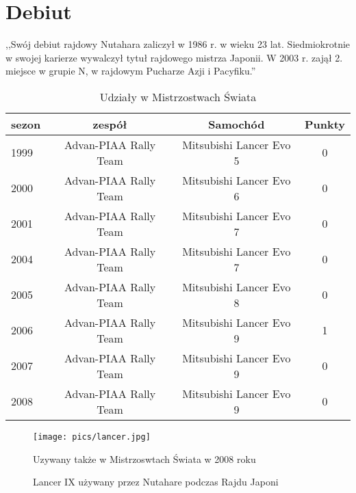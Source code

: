\documentclass[a4paper,12pt]{article}
\begin{document}
\section {Debiut}
\label{deb}
,,Swój debiut rajdowy Nutahara zaliczył w 1986 r. w wieku 23 lat. Siedmiokrotnie w swojej karierze wywalczył tytuł rajdowego mistrza Japonii. W 2003 r. zajął 2. miejsce w grupie N, w rajdowym Pucharze Azji i Pacyfiku.''
\begin{table}
\begin {tabular}{lccc}
\hline
\textbf{sezon}&\textbf {zespół}&\textbf{Samochód}&\textbf{Punkty}\\
\hline
1999&Advan-PIAA Rally Team&Mitsubishi Lancer Evo 5&0\\
\hline
2000&Advan-PIAA Rally Team&Mitsubishi Lancer Evo 6&0\\
\hline
2001&Advan-PIAA Rally Team&Mitsubishi Lancer Evo 7&0\\
\hline
2004&Advan-PIAA Rally Team&Mitsubishi Lancer Evo 7&0\\
\hline
2005&Advan-PIAA Rally Team&Mitsubishi Lancer Evo 8&0\\
\hline
2006&Advan-PIAA Rally Team&Mitsubishi Lancer Evo 9&1\\
\hline
2007&Advan-PIAA Rally Team&Mitsubishi Lancer Evo 9&0\\
\hline
2008&Advan-PIAA Rally Team&Mitsubishi Lancer Evo 9&0 \\
\hline
\end{tabular}
\caption{Udziały w Mistrzostwach Świata}\label{table}
\end {table}
\begin{figure}
\texttt{[image: pics/lancer.jpg]}
\caption{Lancer IX używany przez Nutahare podczas Rajdu Japoni}\label{fig:lancer}Uzywany także w Mistrzoswtach Świata w 2008 roku 
\end{figure}
\end{document}
